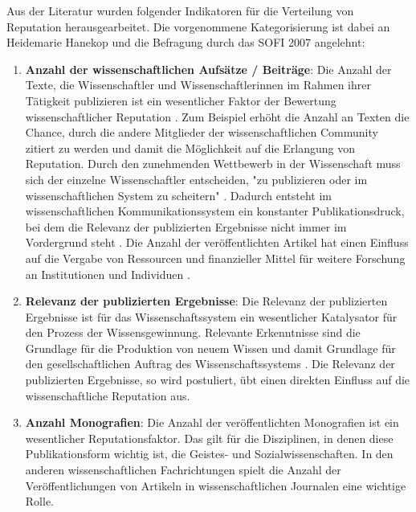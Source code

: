 Aus der Literatur wurden folgender Indikatoren für die Verteilung von Reputation herausgearbeitet. Die vorgenommene Kategorisierung ist dabei an Heidemarie Hanekop \cite{Hanekop_2008} und die Befragung durch das SOFI 2007 \cite{SOFI_2007} angelehnt:
\begin{enumerate}
\item \textbf{Anzahl der wissenschaftlichen Aufsätze / Beiträge}: Die Anzahl der Texte, die Wissenschaftler und Wissenschaftlerinnen im Rahmen ihrer Tätigkeit publizieren ist ein wesentlicher Faktor der Bewertung wissenschaftlicher Reputation \cite{Warnke_2012} \cite{Clapham_2005} \cite{Luhmann_1970}. Zum Beispiel erhöht die Anzahl an Texten die Chance, durch die andere Mitglieder der wissenschaftlichen Community zitiert zu werden und damit die Möglichkeit auf die Erlangung von Reputation. Durch den zunehmenden Wettbewerb in der Wissenschaft muss sich der einzelne Wissenschaftler entscheiden, "zu publizieren oder im wissenschaftlichen System zu scheitern" \cite{Suess_2006}. Dadurch entsteht im wissenschaftlichen Kommunikationssystem ein konstanter Publikationsdruck, bei dem die Relevanz der publizierten Ergebnisse nicht immer im Vordergrund steht \cite{Hamilton_1990}. Die Anzahl der veröffentlichten Artikel hat einen Einfluss auf die Vergabe von Ressourcen und finanzieller Mittel für weitere Forschung an Institutionen und Individuen \cite{Warnke_2012} \cite{Hamilton_1990}.
\item \textbf{Relevanz der publizierten Ergebnisse}: Die Relevanz der publizierten Ergebnisse ist für das Wissenschaftssystem ein wesentlicher Katalysator für den Prozess der Wissensgewinnung. Relevante Erkenntnisse sind die Grundlage für die Produktion von neuem Wissen und damit Grundlage für den gesellschaftlichen Auftrag des Wissenschaftssystems \cite{Hanekop_2008}. Die Relevanz der publizierten Ergebnisse, so wird postuliert, übt einen direkten Einfluss auf die wissenschaftliche Reputation aus.
\item \textbf{Anzahl Monografien}: Die Anzahl der veröffentlichten Monografien ist ein wesentlicher Reputationsfaktor. Das gilt für die Disziplinen, in denen diese Publikationsform wichtig ist, die Geistes- und Sozialwissenschaften. In den anderen wissenschaftlichen Fachrichtungen spielt die Anzahl der Veröffentlichungen von Artikeln in wissenschaftlichen Journalen eine wichtige Rolle.

\end{enumerate}
